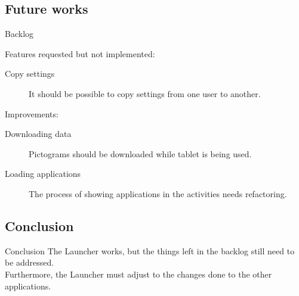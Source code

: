 \subsection{Future works}
\begin{frame}{Backlog}
	
	\begin{block}{Features requested but not implemented:}
	\begin{description}
		\item[Copy settings]{It should be possible to copy settings from one user to another.}
		\end{description}
	\end{block}
	\vspace{\baselineskip}
	
	\begin{block}{Improvements:}
	\begin{description}
		\item[Downloading data]{Pictograms should be downloaded while tablet is being used.}
		\item[Loading applications]{The process of showing applications in the activities needs refactoring.}
		\end{description}
	\end{block}
\end{frame}

\subsection{Conclusion}
\begin{frame}{Conclusion}
	The Launcher works, but the things left in the backlog still need to be addressed.\\
	Furthermore, the Launcher must adjust to the changes done to the other applications.
\end{frame}